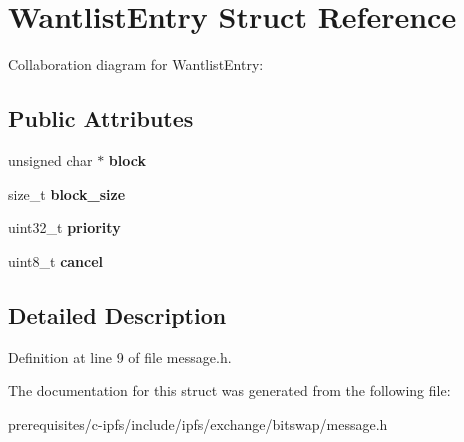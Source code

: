 \hypertarget{struct_wantlist_entry}{}\section{Wantlist\+Entry Struct Reference}
\label{struct_wantlist_entry}


Collaboration diagram for Wantlist\+Entry\+:
\subsection*{Public Attributes}
\begin{DoxyCompactItemize}
\item 
\mbox{\label{struct_wantlist_entry_a11a95ea91e618e34c1a1d83413ffe2bc}} 
unsigned char $\ast$ {\bfseries block}
\item 
\mbox{\label{struct_wantlist_entry_a92eab43c66a4631e693584da15d7aa69}} 
size\+\_\+t {\bfseries block\+\_\+size}
\item 
\mbox{\label{struct_wantlist_entry_a3a415c1682e1979045224819313a937e}} 
uint32\+\_\+t {\bfseries priority}
\item 
\mbox{\label{struct_wantlist_entry_a8723705bc1330055f8c6928c2b7cc8d0}} 
uint8\+\_\+t {\bfseries cancel}
\end{DoxyCompactItemize}


\subsection{Detailed Description}


Definition at line 9 of file message.\+h.



The documentation for this struct was generated from the following file\+:\begin{DoxyCompactItemize}
\item 
prerequisites/c-\/ipfs/include/ipfs/exchange/bitswap/message.\+h\end{DoxyCompactItemize}
